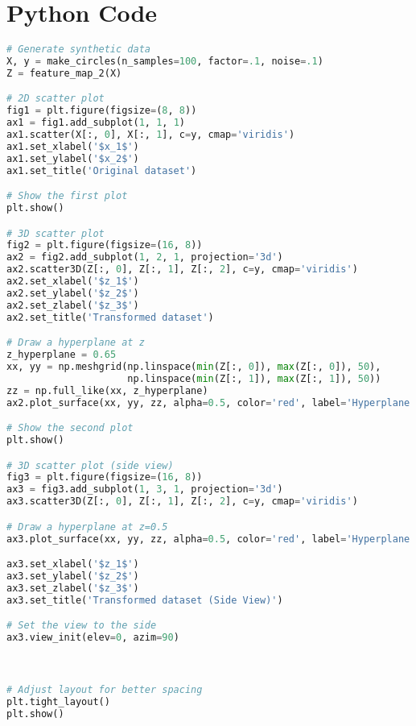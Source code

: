 \documentclass[11pt]{isr} %
\begin{document}
\section{Python Code}

\begin{lstlisting}[language=Python, caption={Kernel example.}, label=code:kernel]
# Generate synthetic data
X, y = make_circles(n_samples=100, factor=.1, noise=.1)
Z = feature_map_2(X)

# 2D scatter plot
fig1 = plt.figure(figsize=(8, 8))
ax1 = fig1.add_subplot(1, 1, 1)
ax1.scatter(X[:, 0], X[:, 1], c=y, cmap='viridis')
ax1.set_xlabel('$x_1$')
ax1.set_ylabel('$x_2$')
ax1.set_title('Original dataset')

# Show the first plot
plt.show()

# 3D scatter plot
fig2 = plt.figure(figsize=(16, 8))
ax2 = fig2.add_subplot(1, 2, 1, projection='3d')
ax2.scatter3D(Z[:, 0], Z[:, 1], Z[:, 2], c=y, cmap='viridis')
ax2.set_xlabel('$z_1$')
ax2.set_ylabel('$z_2$')
ax2.set_zlabel('$z_3$')
ax2.set_title('Transformed dataset')

# Draw a hyperplane at z
z_hyperplane = 0.65
xx, yy = np.meshgrid(np.linspace(min(Z[:, 0]), max(Z[:, 0]), 50),
                     np.linspace(min(Z[:, 1]), max(Z[:, 1]), 50))
zz = np.full_like(xx, z_hyperplane)
ax2.plot_surface(xx, yy, zz, alpha=0.5, color='red', label='Hyperplane')

# Show the second plot
plt.show()

# 3D scatter plot (side view)
fig3 = plt.figure(figsize=(16, 8))
ax3 = fig3.add_subplot(1, 3, 1, projection='3d')
ax3.scatter3D(Z[:, 0], Z[:, 1], Z[:, 2], c=y, cmap='viridis')

# Draw a hyperplane at z=0.5
ax3.plot_surface(xx, yy, zz, alpha=0.5, color='red', label='Hyperplane')

ax3.set_xlabel('$z_1$')
ax3.set_ylabel('$z_2$')
ax3.set_zlabel('$z_3$')
ax3.set_title('Transformed dataset (Side View)')

# Set the view to the side
ax3.view_init(elev=0, azim=90)



# Adjust layout for better spacing
plt.tight_layout()
plt.show()
\end{lstlisting}
\end{document}
